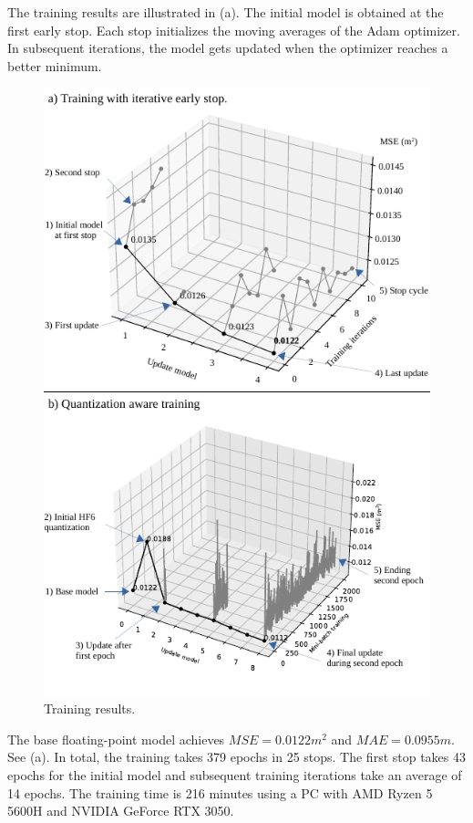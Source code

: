 The training results are illustrated in (a). The initial model is obtained at the first early stop. Each stop initializes the moving averages of the Adam optimizer. In subsequent iterations, the model gets updated when the optimizer reaches a better minimum.

\begin{figure}[h!]
	\centering
	\includegraphics[width=\columnwidth]{../figures/histograms/training_and_quantization.pdf}
	\caption{Training results.}
	\label{fig:optimization}
\end{figure}

The base floating-point model achieves $MSE=0.0122m^2$ and $MAE=0.0955m$. See (a). In total, the training takes 379 epochs in 25 stops. The first stop takes 43 epochs for the initial model and subsequent training iterations take an average of 14 epochs. The training time is 216 minutes using a PC with AMD Ryzen 5 5600H and NVIDIA GeForce RTX 3050.

